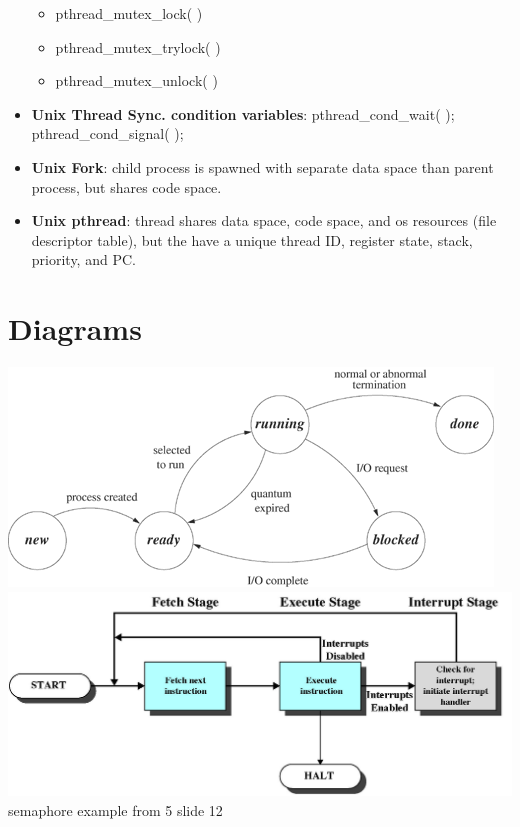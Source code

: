 \documentclass[fontsize=5pt]{scrartcl}
\begin{document}
\begin{multicols}{3}
\begin{itemize}
        \begin{itemize}
          \item pthread\_mutex\_lock( )
          \item pthread\_mutex\_trylock( )
          \item pthread\_mutex\_unlock( )
        \end{itemize}
        \item \textbf{Unix Thread Sync. condition variables}: pthread\_cond\_wait( ); pthread\_cond\_signal( );
        \item \textbf{Unix Fork}: child process is spawned with separate data space than parent process, but shares code space.
        \item \textbf{Unix pthread}: thread shares data space, code space, and os resources (file descriptor table), but the have a unique thread ID, 
                                      register state, stack, priority, and PC.


      \end{itemize}    

  \section{Diagrams}
    \includegraphics[scale=0.2]{process_state.png} \\
     \includegraphics[scale=0.2]{interrupt_cycle.png} \\
      {{semaphore example from 5 slide 12}}
    

\end{multicols}
\end{document}
